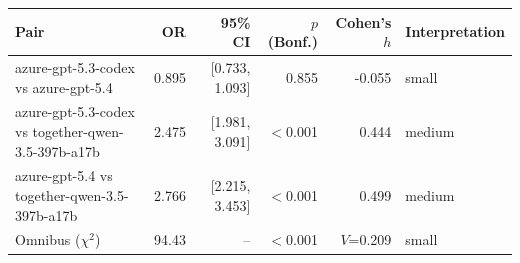 \begin{tabular}{lrrrrl}
\toprule
Pair & OR & 95\% CI & $p$ (Bonf.) & Cohen's $h$ & Interpretation \\
\midrule
azure-gpt-5.3-codex vs azure-gpt-5.4 & 0.895 & [0.733, 1.093] & 0.855 & -0.055 & small \\
azure-gpt-5.3-codex vs together-qwen-3.5-397b-a17b & 2.475 & [1.981, 3.091] & $<$0.001 & 0.444 & medium \\
azure-gpt-5.4 vs together-qwen-3.5-397b-a17b & 2.766 & [2.215, 3.453] & $<$0.001 & 0.499 & medium \\
\midrule
Omnibus ($\chi^2$) & 94.43 & -- & $<$0.001 & $V$=0.209 & small \\
\bottomrule
\end{tabular}
